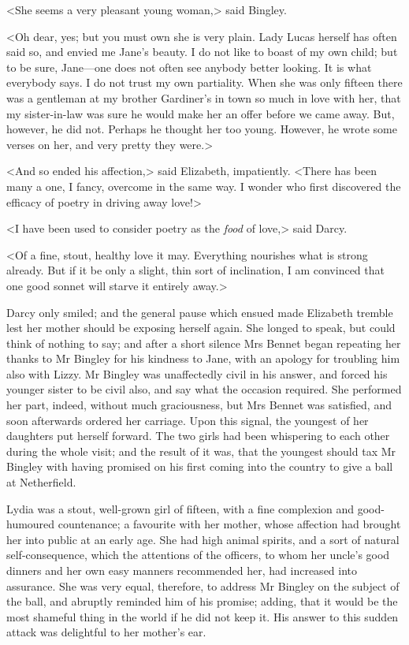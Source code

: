 <She seems a very pleasant young woman,> said Bingley.

<Oh dear, yes; but you must own she is very plain. Lady Lucas herself has often said so, and envied me Jane's beauty. I do not like to boast of my own child; but to be sure, Jane—one does not often see anybody better looking. It is what everybody says. I do not trust my own partiality. When she was only fifteen there was a gentleman at my brother Gardiner's in town so much in love with her, that my sister-in-law was sure he would make her an offer before we came away. But, however, he did not. Perhaps he thought her too young. However, he wrote some verses on her, and very pretty they were.>

<And so ended his affection,> said Elizabeth, impatiently. <There has been many a one, I fancy, overcome in the same way. I wonder who first discovered the efficacy of poetry in driving away love!>

<I have been used to consider poetry as the \textit{food} of love,> said Darcy.

<Of a fine, stout, healthy love it may. Everything nourishes what is strong already. But if it be only a slight, thin sort of inclination, I am convinced that one good sonnet will starve it entirely away.>

Darcy only smiled; and the general pause which ensued made Elizabeth tremble lest her mother should be exposing herself again. She longed to speak, but could think of nothing to say; and after a short silence Mrs Bennet began repeating her thanks to Mr Bingley for his kindness to Jane, with an apology for troubling him also with Lizzy. Mr Bingley was unaffectedly civil in his answer, and forced his younger sister to be civil also, and say what the occasion required. She performed her part, indeed, without much graciousness, but Mrs Bennet was satisfied, and soon afterwards ordered her carriage. Upon this signal, the youngest of her daughters put herself forward. The two girls had been whispering to each other during the whole visit; and the result of it was, that the youngest should tax Mr Bingley with having promised on his first coming into the country to give a ball at Netherfield.

Lydia was a stout, well-grown girl of fifteen, with a fine complexion and good-humoured countenance; a favourite with her mother, whose affection had brought her into public at an early age. She had high animal spirits, and a sort of natural \newline self-consequence, which the attentions of the officers, to whom her uncle's good dinners and her own easy manners recommended her, had increased into assurance. She was very equal, therefore, to address Mr Bingley on the subject of the ball, and abruptly reminded him of his promise; adding, that it would be the most shameful thing in the world if he did not keep it. His answer to this sudden attack was delightful to her mother's ear.

